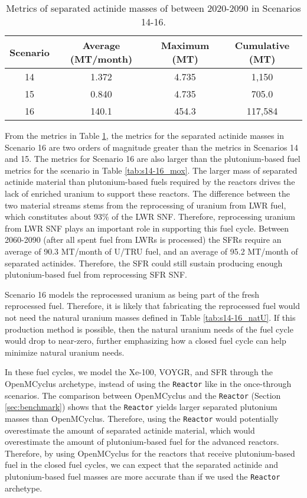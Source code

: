 \begin{table}[h!]
    \centering 
    \caption{Metrics of separated actinide masses of between 2020-2090 in 
    Scenarios 14-16.}
    \label{tab:s14-16_sep_pu}
    \begin{tabular}{c c c c}
        \hline 
        Scenario & Average (MT/month) & Maximum (MT) & Cumulative (MT) \\
        \hline
        14 & 1.372 & 4.735 & 1,150\\
        15 & 0.840 & 4.735 & 705.0\\
        16 & 140.1 & 454.3 & 117,584\\
        \hline
    \end{tabular}
\end{table}

From the metrics in Table \ref{tab:s14-16_sep_pu}, the metrics for 
the separated actinide masses in Scenario 16 are two orders of 
magnitude greater than the metrics in Scenarios 14 and 15. The metrics 
for Scenario 16 are also larger than the plutonium-based fuel metrics 
for the scenario in Table \ref{tab:s14-16_mox}. The larger mass 
of separated actinide material than plutonium-based fuels required by 
the reactors drives the lack of enriched uranium to support these 
reactors. The difference between the two material streams stems 
from the reprocessing of uranium from \gls{LWR} fuel, which constitutes 
about 93\% of the \gls{LWR} \gls{SNF}. Therefore, reprocessing 
uranium from \gls{LWR} \gls{SNF} plays an important role in supporting 
this fuel cycle. Between 2060-2090 (after all spent fuel from 
\glspl{LWR} is processed) the \glspl{SFR} require an 
average of 90.3 MT/month of U/TRU fuel, and an average of 95.2 
MT/month of separated actinides. Therefore, the \gls{SFR} could 
still sustain producing enough plutonium-based 
fuel from reprocessing \gls{SFR} \gls{SNF}.

Scenario 16 models the reprocessed uranium as being part of 
the fresh reprocessed fuel. Therefore, it is likely that 
fabricating the reprocessed fuel would not need the natural
uranium masses defined in Table \ref{tab:s14-16_natU}. If this 
production method is possible, then the natural uranium needs 
of the fuel cycle would drop to near-zero, further 
emphasizing how a closed fuel cycle can help minimize
natural uranium needs. 

In these fuel cycles, we model the Xe-100, VOYGR, and \gls{SFR} 
through the OpenMCyclus archetype, instead of using the 
\Cycamore \texttt{Reactor} like in the once-through scenarios. 
The comparison between OpenMCyclus 
and the \Cycamore \texttt{Reactor} (Section \ref{sec:benchmark})
shows that the \Cycamore \texttt{Reactor} yields larger separated 
plutonium masses than OpenMCyclus. Therefore, using the \Cycamore 
\texttt{Reactor} would potentially overestimate the amount of 
separated actinide material, which would overestimate the 
amount of plutonium-based fuel for the advanced reactors. 
Therefore, by using OpenMCyclus for the reactors that 
receive plutonium-based fuel in the closed fuel cycles, we can 
expect that the separated actinide and plutonium-based fuel masses are 
more accurate than if we used the \Cycamore \texttt{Reactor} 
archetype. 


